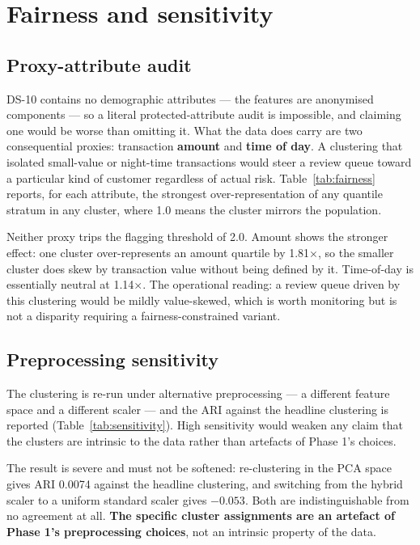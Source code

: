 \documentclass[11pt, a4paper]{article}
\providecommand{\num}[1]{#1}
\begin{document}
\section{Fairness and sensitivity}

\subsection{Proxy-attribute audit}
DS-10 contains no demographic attributes --- the features are anonymised
components --- so a literal protected-attribute audit is impossible, and
claiming one would be worse than omitting it. What the data does carry are two
consequential proxies: transaction \textbf{amount} and \textbf{time of day}. A
clustering that isolated small-value or night-time transactions would steer a
review queue toward a particular kind of customer regardless of actual risk.
Table~\ref{tab:fairness} reports, for each attribute, the strongest
over-representation of any quantile stratum in any cluster, where 1.0 means the
cluster mirrors the population.



Neither proxy trips the flagging threshold of \num{2.0}. Amount shows the
stronger effect: one cluster over-represents an amount quartile by
\num{1.81}$\times$, so the smaller cluster does skew by transaction value without
being defined by it. Time-of-day is essentially neutral at \num{1.14}$\times$.
The operational reading: a review queue driven by this clustering would be mildly
value-skewed, which is worth monitoring but is not a disparity requiring a
fairness-constrained variant.

\subsection{Preprocessing sensitivity}
The clustering is re-run under alternative preprocessing --- a different feature
space and a different scaler --- and the ARI against the headline clustering is
reported (Table~\ref{tab:sensitivity}). High sensitivity would weaken any claim
that the clusters are intrinsic to the data rather than artefacts of Phase 1's
choices.



The result is severe and must not be softened: re-clustering in the PCA space
gives ARI \num{0.0074} against the headline clustering, and switching from the
hybrid scaler to a uniform standard scaler gives $-\num{0.053}$. Both are
indistinguishable from no agreement at all. \textbf{The specific cluster
assignments are an artefact of Phase 1's preprocessing choices}, not an intrinsic
property of the data.
\end{document}
